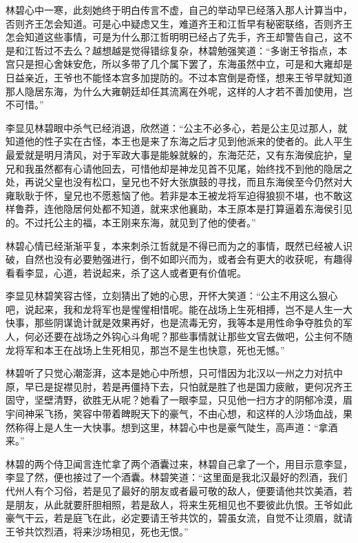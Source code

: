 林碧心中一寒，此刻她终于明白传言不虚，自己的举动早已经落入那人计算当中，否则齐王怎会知道。可是心中疑虑又生，难道齐王和江哲早有秘密联络，否则齐王怎会知道这些事情，可是为什么那江哲明明已经占了先手，齐王却警告自己，这不是和江哲过不去么？越想越是觉得错综复杂，林碧勉强笑道：“多谢王爷指点，本宫只是担心舍妹安危，所以多带了几个属下罢了，东海虽然中立，可是和大雍却是日益亲近，王爷也不能怪本宫多加提防的。不过本宫倒是奇怪，想来王爷早就知道那人隐居东海，为什么大雍朝廷却任其流离在外呢，这样的人才若不善加使用，岂不可惜。”

李显见林碧眼中杀气已经消退，欣然道：“公主不必多心，若是公主见过那人，就知道他的性子实在古怪，本王也是来了东海之后才见到他派来的使者的。此人平生最爱就是明月清风，对于军政大事是能躲就躲的，东海茫茫，又有东海侯庇护，皇兄和我虽然都有心请他回去，可惜他却是神龙见首不见尾，始终找不到他的隐居之处，再说父皇也没有松口，皇兄也不好大张旗鼓的寻找，而且东海侯至今仍然对大雍耿耿于怀，皇兄也不愿惹恼了他。若非是本王被龙将军迫得狼狈不堪，也不敢这样鲁莽，连他隐居何处都不知道，就来求他襄助，本王原本是打算逼着东海侯引见的。不过托公主的福，本王刚来东海，就见到了他的使者。”

林碧心情已经渐渐平复，本来刺杀江哲就是不得已而为之的事情，既然已经被人识破，自然也没有必要勉强进行，倒不如即兴而为，或者会有更大的收获呢，有趣得看看李显，心道，若说起来，杀了这人或者更有价值呢。

李显见林碧笑容古怪，立刻猜出了她的心思，开怀大笑道：“公主不用这么狠心吧，说起来，我和龙将军也是惺惺相惜呢。能在战场上生死相搏，岂不是人生一大快事，那些阴谋诡计就是效果再好，也是流毒无穷，我等本是用性命争夺胜负的军人，何必还要在战场之外钩心斗角呢？那些事情就让那些文官去做吧，公主何不随龙将军和本王在战场上生死相见，那岂不是生也快意，死也无憾。”

林碧听了只觉心潮澎湃，这本是她心中所想，只可惜因为北汉以一州之力对抗中原，早已是捉襟见肘，若是再僵持下去，只怕就是胜了也是国力疲敝，更何况齐王固守，坚壁清野，欲胜无从呢？她看了一眼李显，只见他一扫方才的阴郁冷漠，眉宇间神采飞扬，笑容中带着睥睨天下的豪气，不由心想，和这样的人沙场血战，果然称得上是人生一大快事。想到这里，林碧心中也是豪气陡生，高声道：“拿酒来。”

林碧的两个侍卫闻言连忙拿了两个酒囊过来，林碧自己拿了一个，用目示意李显，李显了然，便也接过了一个酒囊。林碧笑道：“这里面是我北汉最好的烈酒，我们代州人有个习俗，若是见了最好的朋友或者最可敬的敌人，便要请他共饮美酒，若是朋友，从此就要肝胆相照，若是敌人，将来生死相见也不要彼此仇恨。王爷如此豪气干云，若是庭飞在此，必定要请王爷共饮的，碧虽女流，自觉不让须眉，就请王爷共饮烈酒，将来沙场相见，死也无恨。”

